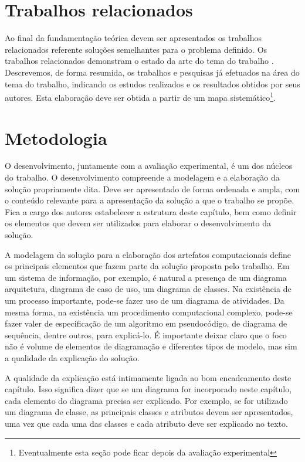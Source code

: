 \documentclass[12pt]{article}
\begin{document}
	
	
	\section{Trabalhos relacionados}
	\label{sec:trab_relacionados}
	
	Ao final da fundamentação teórica devem ser apresentados os trabalhos relacionados referente soluções semelhantes para o problema definido. Os trabalhos relacionados demonstram o estado da arte do tema do trabalho \citep{wazlawick_metodologia_2017}. Descrevemos, de forma resumida, os trabalhos e pesquisas já efetuados na área do tema do trabalho, indicando os estudos realizados e os resultados obtidos por seus autores. Esta elaboração deve ser obtida a partir de um mapa sistemático\footnote{Eventualmente esta seção pode ficar depois da avaliação experimental}. 
	
	\section{Metodologia}
	\label{sec:metodologia}
	
	O desenvolvimento, juntamente com a avaliação experimental, é um dos núcleos do trabalho. O desenvolvimento compreende a modelagem e a elaboração da solução propriamente dita. Deve ser apresentado de forma ordenada e ampla, com o conteúdo relevante para a apresentação da solução a que o trabalho se propõe. Fica a cargo dos autores estabelecer a estrutura deste capítulo, bem como definir os elementos que devem ser utilizados para elaborar o desenvolvimento da solução. 
	
	A modelagem da solução para a elaboração dos artefatos computacionais define os principais elementos que fazem parte da solução proposta pelo trabalho. Em um sistema de informação, por exemplo, é natural a presença de um diagrama arquitetura, diagrama de caso de uso, um diagrama de classes. Na existência de um processo importante, pode-se fazer uso de um diagrama de atividades. Da mesma forma, na existência um procedimento computacional complexo, pode-se fazer valer de especificação de um algoritmo em pseudocódigo, de diagrama de sequência, dentre outros, para explicá-lo. É importante deixar claro que o foco não é volume de elementos de diagramação e diferentes tipos de modelo, mas sim a qualidade da explicação do solução.
	
	A qualidade da explicação está intimamente ligada ao bom encadeamento deste capítulo. Isso significa dizer que se um diagrama for incorporado neste capítulo, cada elemento do diagrama precisa ser explicado. Por exemplo, se for utilizado um diagrama de classe, as principais classes e atributos devem ser apresentados, uma vez que cada uma das classes e cada atributo deve ser explicado no texto.
	
\end{document}

